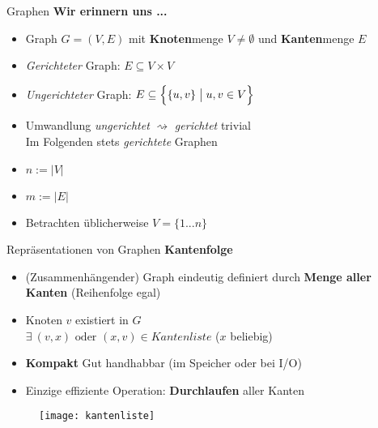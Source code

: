 

\begin{frame}{Graphen}
	\textbf{Wir erinnern uns ...} 
	\begin{itemize}
		\item Graph $G = (V, E)$ mit \textbf{Knoten}menge $V \neq \emptyset$ und \textbf{Kanten}menge $E$
		\pause
		\item \emph{Gerichteter} Graph: $E \subseteq V \times V$
		\item \emph{Ungerichteter} Graph: $E \subseteq \Big\lbrace \{u, v\} \bigm| u, v \in V \Big\rbrace$
		\pause
		\item Umwandlung \textit{ungerichtet} $\rightsquigarrow$ \textit{gerichtet} trivial \\ 
		\impl Im Folgenden stets \emph{gerichtete} Graphen
		\pause
		\item $n := |V|$
		\item $m := |E|$
		\pause
		\item Betrachten üblicherweise $V = \{1...n\}$ 
	\end{itemize}
\end{frame}

\begin{frame}{Repräsentationen von Graphen}
	\textbf{Kantenfolge} \\[0,125cm]
	\begin{itemize}
		\item {\small (Zusammenhängender)} Graph eindeutig definiert durch \textbf{Menge aller Kanten} (Reihenfolge egal)
		\pause
		\item Knoten $v$ existiert in $G$ \\ 
		\gdw $\exists\ (v, x) \text{ oder } (x, v) \in \textit{Kantenliste}$ \quad ($x$ beliebig)
		\pause
		\item[\Pros] \textbf{Kompakt} \impl Gut handhabbar (im Speicher oder bei I/O)
		\pause
		\item[\Cons] Einzige effiziente Operation: \textbf{Durchlaufen} aller Kanten
	\end{itemize}
	\begin{figure}[htp]
		\centering
		\texttt{[image: kantenliste]}
	\end{figure}
\end{frame}

